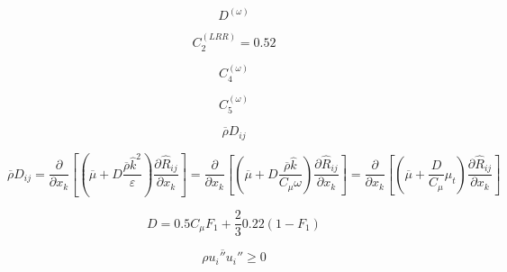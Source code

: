 {\newpage\clearpage
{}%
\begin{displaymath}
D^{(\omega)}
\end{displaymath}%
\lthtmldisplayZ
\lthtmlcheckvsize\clearpage}

{\newpage\clearpage
{}%
\begin{displaymath}
C_2^{(LRR)} = 0.52
\end{displaymath}%
\lthtmldisplayZ
\lthtmlcheckvsize\clearpage}

{\newpage\clearpage
{}%
\begin{displaymath}
C_4^{(\omega)}
\end{displaymath}%
\lthtmldisplayZ
\lthtmlcheckvsize\clearpage}

{\newpage\clearpage
{}%
\begin{displaymath}
C_5^{(\omega)}
\end{displaymath}%
\lthtmldisplayZ
\lthtmlcheckvsize\clearpage}

{\newpage\clearpage
{}%
\begin{displaymath}
\overline \rho D_{ij}
\end{displaymath}%
\lthtmldisplayZ
\lthtmlcheckvsize\clearpage}

{\newpage\clearpage
{}%
\begin{displaymath}
\overline \rho D_{ij} = \frac{\partial}{\partial x_k}
\left[ \left( \overline \mu + D \frac{\overline \rho \hat k^2}{\varepsilon}
\right) \frac{\partial \hat R_{ij}}{\partial x_k} \right]
= \frac{\partial}{\partial x_k}
\left[ \left( \overline \mu + D \frac{\overline \rho \hat k}{C_{\mu} \omega}
\right) \frac{\partial \hat R_{ij}}{\partial x_k} \right]
= \frac{\partial}{\partial x_k}
\left[ \left( \overline \mu + \frac{D}{C_{\mu}} \mu_t
\right) \frac{\partial \hat R_{ij}}{\partial x_k} \right]
\end{displaymath}%
\lthtmldisplayZ
\lthtmlcheckvsize\clearpage}

{\newpage\clearpage
{}%
\begin{displaymath}
D = 0.5 C_{\mu} F_1 + \frac{2}{3} 0.22 (1-F_1)
\end{displaymath}%
\lthtmldisplayZ
\lthtmlcheckvsize\clearpage}

{\newpage\clearpage
{}%
\begin{displaymath}
\overline {\rho u_i'' u_i''} \geq 0
\end{displaymath}%
\lthtmldisplayZ
\lthtmlcheckvsize\clearpage}

